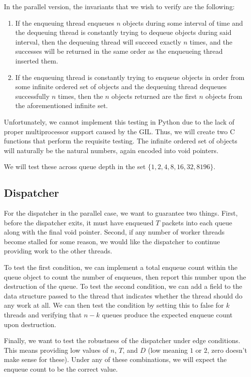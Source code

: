 \documentclass{article}
\begin{document}
In the parallel version, the invariants that we wish to verify are the following:
\begin{enumerate}
    \item If the enqueuing thread enqueues $n$ objects during some interval of time and the dequeuing thread is constantly trying to dequeue objects during said interval, then the dequeuing thread will succeed exactly $n$ times, and the successes will be returned in the same order as the enqueueing thread inserted them.
    \item If the enqueuing thread is constantly trying to enqueue objects in order from some infinite ordered set of objects and the dequeuing thread dequeues successfully $n$ times, then the $n$ objects returned are the first $n$ objects from the aforementioned infinite set.
\end{enumerate}
Unfortunately, we cannot implement this testing in Python due to the lack of proper multiprocessor support caused by the GIL. Thus, we will create two C functions that perform the requisite testing. The infinite ordered set of objects will naturally be the natural numbers, again encoded into void pointers. 

We will test these across queue depth in the set $\{1,2,4,8,16,32,8196\}$. 
\subsection*{Dispatcher}
For the dispatcher in the parallel case, we want to guarantee two things. First, before the dispatcher exits, it must have enqueued $T$ packets into each queue along with the final void pointer. Second, if any number of worker threads become stalled for some reason, we would like the dispatcher to continue providing work to the other threads. 

To test the first condition, we can implement a total enqueue count within the queue object to count the number of enqueues, then report this number upon the destruction of the queue. To test the second condition, we can add a field to the data structure passed to the thread that indicates whether the thread should do any work at all. We can then test the condition by setting this to false for $k$ threads and verifying that $n-k$ queues produce the expected enqueue count upon destruction.

Finally, we want to test the robustness of the dispatcher under edge conditions. This means providing low values of $n$, $T$, and $D$ (low meaning $1$ or $2$, zero doesn't make sense for these). Under any of these combinations, we will expect the enqueue count to be the correct value. 
\end{document}
